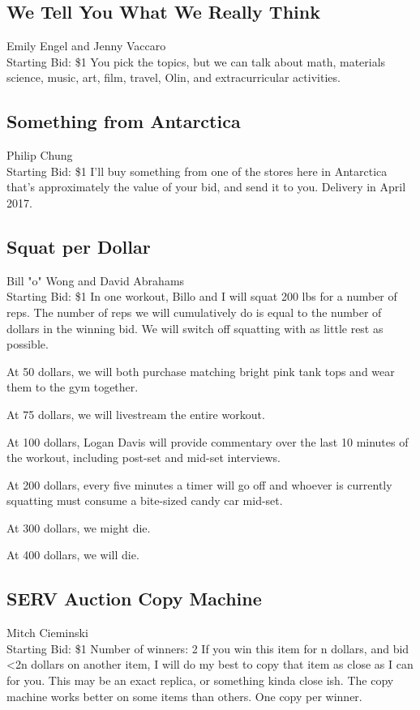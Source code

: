 \documentclass[11pt]{article}
\begin{document}
\subsection{We Tell You What We Really Think}
Emily Engel and Jenny Vaccaro
\\
Starting Bid: \$1
\newline
You pick the topics, but we can talk about math, materials science, music, art, film, travel, Olin, and extracurricular activities.
\subsection{Something from Antarctica}
Philip Chung
\\
Starting Bid: \$1
\newline
I'll buy something from one of the stores here in Antarctica that's approximately the value of your bid, and send it to you. Delivery in April 2017.
\subsection{Squat per Dollar}
Bill "o" Wong and David Abrahams
\\
Starting Bid: \$1
\newline
In one workout, Billo and I will squat 200 lbs for a number of reps. The number of reps we will cumulatively do is equal to the number of dollars in the winning bid. We will switch off squatting with as little rest as possible.

At 50 dollars, we will both purchase matching bright pink tank tops and wear them to the gym together.

At 75 dollars, we will livestream the entire workout.

At 100 dollars, Logan Davis will provide commentary over the last 10 minutes of the workout, including post-set and mid-set interviews.

At 200 dollars, every five minutes a timer will go off and whoever is currently squatting must consume a bite-sized candy car mid-set.

At 300 dollars, we might die.

At 400 dollars, we will die.
\subsection{SERV Auction Copy Machine}
Mitch Cieminski
\\
Starting Bid: \$1
\newline
Number of winners: 2
\newline
If you win this item for n dollars, and bid \textless 2n dollars on another item, I will do my best to copy that item as close as I can for you. This may be an exact replica, or something kinda close ish. The copy machine works better on some items than others. One copy per winner.
\end{document}
